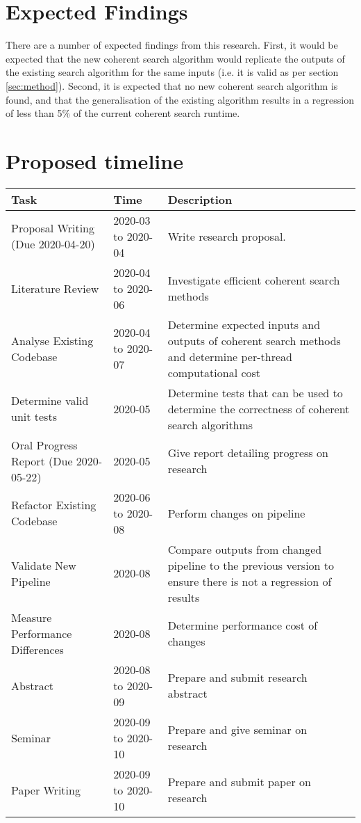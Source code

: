\documentclass{article}
\begin{document}
\section{Expected Findings}

There are a number of expected findings from this research. First, it would be expected that the
new coherent search algorithm would replicate the outputs of the existing search algorithm for the
same inputs (i.e. it is valid as per section \ref{sec:method}). Second, it is expected that no new
coherent search algorithm is found, and that the generalisation of the existing algorithm results
in a regression of less than 5\% of the current coherent search runtime.

\section{Proposed timeline}

\begin{center}
    \begin{longtable}{|p{}|p{}|p{}|} \hline
        \rowcolor[HTML]{454545}
        {\color[HTML]{EFEFEF} \textbf{Task} } & {\color[HTML]{EFEFEF} \textbf{Time} }
        & {\color[HTML]{EFEFEF} \textbf{Description} } \\ \hline
        Proposal Writing (Due 2020-04-20) & 2020-03 to 2020-04 & Write research proposal. \\ \hline
        Literature Review & 2020-04 to 2020-06 & Investigate efficient coherent search methods \\
        \hline
        Analyse Existing Codebase & 2020-04 to 2020-07 & Determine expected inputs and outputs of
        coherent search methods and determine per-thread computational cost \\ \hline
        Determine valid unit tests & 2020-05 & Determine tests that can be used to determine the
        correctness of coherent search algorithms \\ \hline
        Oral Progress Report (Due 2020-05-22) & 2020-05 & Give report detailing progress on
        research \\ \hline
        Refactor Existing Codebase & 2020-06 to 2020-08 & Perform changes on pipeline \\ \hline
        Validate New Pipeline & 2020-08 & Compare outputs from changed pipeline to the previous
        version to ensure there is not a regression of results \\ \hline
        Measure Performance Differences & 2020-08 & Determine performance cost of changes \\ \hline
        Abstract & 2020-08 to 2020-09 & Prepare and submit research abstract \\ \hline
        Seminar & 2020-09 to 2020-10 & Prepare and give seminar on research \\ \hline
        Paper Writing & 2020-09 to 2020-10 & Prepare and submit paper on research \\ \hline
    \end{longtable}
\end{center}

\printbibliography[
    heading=bibintoc,
    title={Bibliography}
]{}
\end{document}
